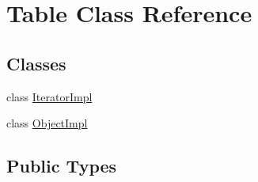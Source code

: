 \hypertarget{class_table}{}\section{Table Class Reference}
\label{class_table}
\subsection*{Classes}
\begin{DoxyCompactItemize}
\item 
class \hyperlink{class_table_1_1_iterator_impl}{Iterator\+Impl}
\item 
class \hyperlink{class_table_1_1_object_impl}{Object\+Impl}
\end{DoxyCompactItemize}
\subsection*{Public Types}
